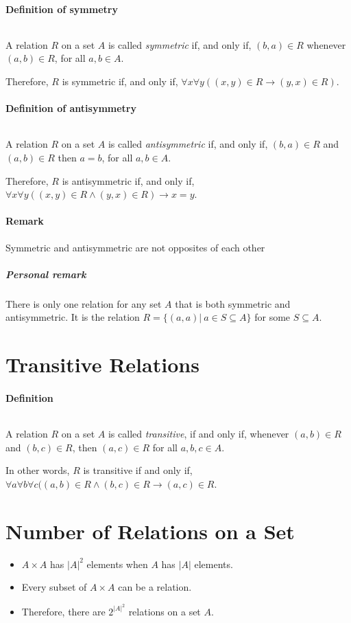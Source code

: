 \documentclass[10pt,a4paper]{book}
\begin{document}
\paragraph*{Definition of symmetry}
$\ $\par 
A relation $R$ on a set $A$ is called \textit{symmetric} if, and only if, $(b,a) \in R$ whenever $(a,b) \in R$, for all $a,b \in A$.\par
Therefore, $R$ is symmetric if, and only if, $\forall x \forall y ((x,y) \in R \to (y,x) \in R)$.

\paragraph*{Definition of antisymmetry}
$\ $\par
A relation $R$ on a set $A$ is called \textit{antisymmetric} if, and only if, $(b,a) \in R$ and $(a,b) \in R$ then $a = b$, for all $a,b \in A$.\par
Therefore, $R$ is antisymmetric if, and only if, $\forall x \forall y ((x,y) \in R \land (y,x) \in R) \to x = y$.

\paragraph*{Remark}
Symmetric and antisymmetric are not opposites of each other
 
\subparagraph*{Personal remark}
There is only one relation for any set $A$ that is both symmetric and antisymmetric. It is the relation $R = \{(a,a)|\ a\in S\subseteq A\}$ for some $S\subseteq A$.

\section{Transitive Relations}

\paragraph*{Definition}
$\ $\par
A relation $R$ on a set $A$ is called \textit{transitive}, if and only if, whenever $(a,b) \in R$ and $(b,c) \in R$, then $(a,c) \in R$ for all $a,b,c \in A$.\par
In other words, $R$ is transitive if and only if, $\forall a \forall b \forall c ((a,b) \in R \land (b,c) \in R \to (a,c) \in R$.

\section{Number of Relations on a Set}
\begin{itemize}
\item $A \times A$ has $|A|^2$ elements when $A$ has $|A|$ elements.
\item Every subset of $A \times A$ can be a relation.
\item Therefore, there are $2^{{|A|}^2}$ relations on a set $A$.
\end{itemize}
\end{document}
